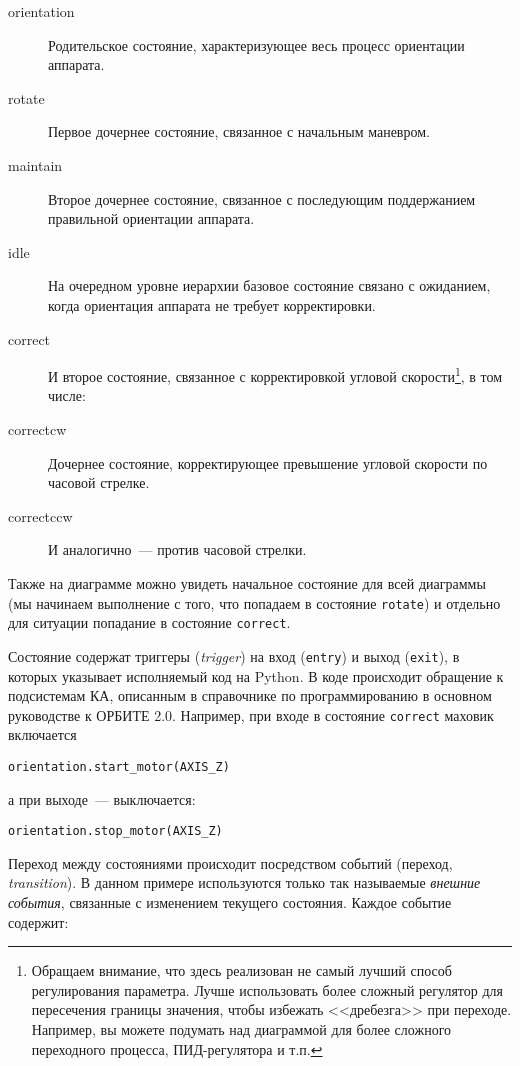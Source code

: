 \documentclass[12pt,a4paper]{article}
\begin{document}
\begin{description}
\item[orientation] Родительское состояние, характеризующее весь процесс ориентации
  аппарата.
\item[rotate] Первое дочернее состояние, связанное с начальным маневром.
\item[maintain] Второе дочернее состояние, связанное с последующим поддержанием правильной
  ориентации аппарата.
\item[idle] На очередном уровне иерархии базовое состояние связано с ожиданием, когда
  ориентация аппарата не требует корректировки.
\item[correct] И второе состояние, связанное с корректировкой угловой
  скорости\footnote{Обращаем внимание, что здесь реализован не самый лучший способ
    регулирования параметра. Лучше использовать более сложный регулятор для пересечения
    границы значения, чтобы избежать <<дребезга>> при переходе. Например, вы можете подумать
    над диаграммой для более сложного переходного процесса, ПИД-регулятора и т.п.}, в том числе:
\item[correct\textunderscore cw] Дочернее состояние, корректирующее превышение угловой
  скорости по часовой стрелке.
\item[correct\textunderscore ccw] И аналогично~--- против часовой стрелки. 
\end{description}

Также на диаграмме можно увидеть начальное состояние для всей диаграммы (мы начинаем
выполнение с того, что попадаем в состояние \verb'rotate') и отдельно для ситуации
попадание в состояние \verb'correct'.

Состояние содержат триггеры (\emph{trigger}) на вход (\verb'entry') и выход (\verb'exit'), в которых
указывает исполняемый код на Python. В коде происходит обращение к подсистемам КА,
описанным в справочнике по программированию в основном руководстве к ОРБИТЕ 2.0. Например,
при входе в состояние  \verb'correct' маховик включается

\begin{verbatim}
orientation.start_motor(AXIS_Z)
\end{verbatim}

а при выходе~--- выключается:

\begin{verbatim}
orientation.stop_motor(AXIS_Z)
\end{verbatim}

Переход между состояниями происходит посредством событий (переход, \emph{transition}). В
данном примере используются только так называемые \emph{внешние события}, связанные с
изменением текущего состояния. Каждое событие содержит:
\end{document}
